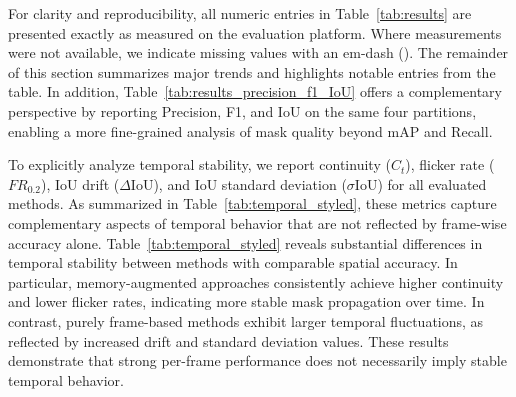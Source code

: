 \documentclass[preprint,12pt]{elsarticle}
\begin{document}
For clarity and reproducibility, all numeric entries in Table~\ref{tab:results} are presented exactly as measured on the evaluation platform. Where measurements were not available, we indicate missing values with an em-dash (\textemdash). The remainder of this section summarizes major trends and highlights notable entries from the table. In addition, Table~\ref{tab:results_precision_f1_IoU} offers a complementary perspective by reporting Precision, F1, and IoU on the same four partitions, enabling a more fine-grained analysis of mask quality beyond $\mathrm{mAP}$ and Recall. 

To explicitly analyze temporal stability, we report continuity ($C_t$), flicker rate ($FR_{0.2}$), IoU drift ($\Delta$IoU), and IoU standard deviation ($\sigma$IoU) for all evaluated methods. As summarized in Table~\ref{tab:temporal_styled}, these metrics capture complementary aspects of temporal behavior that are not reflected by frame-wise accuracy alone. Table~\ref{tab:temporal_styled} reveals substantial differences in temporal stability between methods with comparable spatial accuracy. In particular, memory-augmented approaches consistently achieve higher continuity and lower flicker rates, indicating more stable mask propagation over time. In contrast, purely frame-based methods exhibit larger temporal fluctuations, as reflected by increased drift and standard deviation values. These results demonstrate that strong per-frame performance does not necessarily imply stable temporal behavior. 
\end{document}
